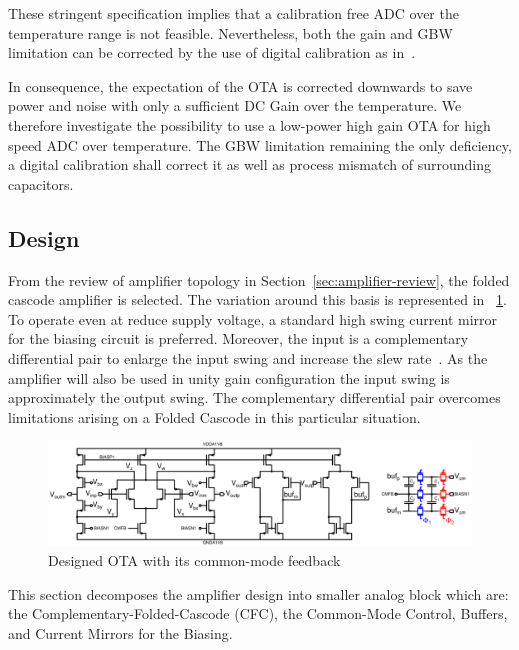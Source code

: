These stringent specification implies that a calibration free ADC over the temperature range is not feasible. Nevertheless, both the gain and GBW limitation can be corrected by the use of digital calibration as in~\cite{Sahoo2013, Bafandeh2016}.

In consequence, the expectation of the OTA is corrected downwards to save power and noise with only a sufficient DC Gain over the temperature. We therefore investigate the possibility to use a low-power high gain OTA for high speed ADC over temperature. The GBW limitation remaining the only deficiency, a digital calibration shall correct it as well as process mismatch of surrounding capacitors.

    \subsection{Design}                          %
From the review of amplifier topology in Section~\ref{sec:amplifier-review}, the folded cascode amplifier is selected. The variation around this basis is represented in \figurename~\ref{fig:ota_cfc_buf}. To operate even at reduce supply voltage, a standard high swing current mirror for the biasing circuit is preferred. Moreover, the input is a complementary differential pair to enlarge the input swing and increase the slew rate~\cite{Olivera1999}. As the amplifier will also be used in unity gain configuration the input swing is approximately the output swing. The complementary differential pair overcomes limitations arising on a Folded Cascode in this particular situation.

\begin{figure}[htp]
    \centering
    \includegraphics[width=\textwidth]{Chapter7/Figs/ota_cfc_buf_high_swing_gb}
    \caption{Designed OTA with its common-mode feedback}
    \label{fig:ota_cfc_buf}
\end{figure}

This section decomposes the amplifier design into smaller analog block which are: the Complementary-Folded-Cascode (CFC), the Common-Mode Control, Buffers, and Current Mirrors for the Biasing.

